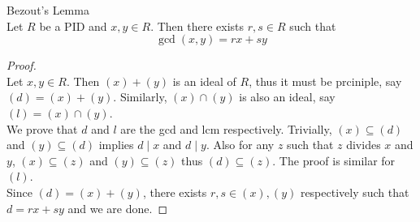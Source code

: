 \documentclass[a4paper]{article}
\begin{document}
\begin{lmm}{Bezout's Lemma}{}\\
Let $R$ be a PID and $x,y\in R$. Then there exists $r,s\in R$ such that $$\gcd(x,y)=rx+sy$$ 
\begin{proof}\\
Let $x,y\in R$. Then $(x)+(y)$ is an ideal of $R$, thus it must be prciniple, say $(d)=(x)+(y)$. Similarly, $(x)\cap(y)$ is also an ideal, say $(l)=(x)\cap(y)$. \\
We prove that $d$ and $l$ are the gcd and lcm respectively. Trivially, $(x)\subseteq(d)$ and $(y)\subseteq(d)$ implies $d\;|\;x$ and $d\;|\;y$. Also for any $z$ such that $z$ divides $x$ and $y$, $(x)\subseteq(z)$ and $(y)\subseteq(z)$ thus $(d)\subseteq(z)$. The proof is similar for $(l)$. \\
Since $(d)=(x)+(y)$, there exists $r,s\in (x),(y)$ respectively such that $d=rx+sy$ and we are done. 
\end{proof}
\end{lmm}
\end{document}

